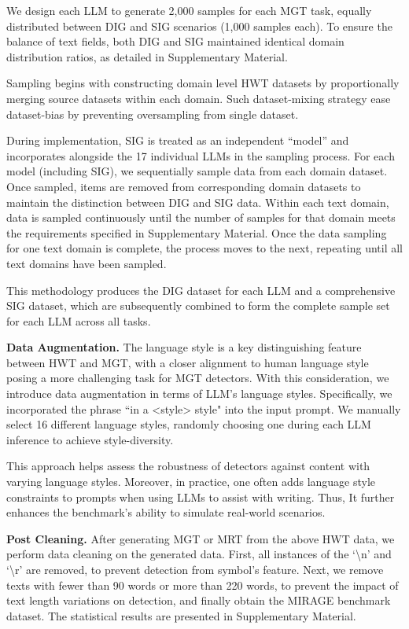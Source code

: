 %
We design each LLM to generate 2,000 samples for each MGT task, equally distributed between DIG and SIG scenarios (1,000 samples each).
%
To ensure the balance of text fields, both DIG and SIG maintained identical domain distribution ratios, as detailed in Supplementary Material.

Sampling begins with constructing domain level HWT datasets by proportionally merging source datasets within each domain.
%
Such dataset-mixing strategy ease dataset-bias by preventing oversampling from single dataset.

During implementation, SIG is treated as an independent ``model'' and incorporates alongside the 17 individual LLMs in the sampling process.
%
For each model (including SIG), we sequentially sample data from each domain dataset.
%
Once sampled, items are removed from corresponding domain datasets to maintain the distinction between DIG and SIG data.
%
Within each text domain, data is sampled continuously until the number of samples for that domain meets the requirements specified in Supplementary Material.
%
Once the data sampling for one text domain is complete, the process moves to the next, repeating until all text domains have been sampled.

This methodology produces the DIG dataset for each LLM and a comprehensive SIG dataset, which are subsequently combined to form the complete sample set for each LLM across all tasks.

\noindent \textbf{Data Augmentation. }
The language style is a key distinguishing feature between HWT and MGT, with a closer alignment to human language style posing a more challenging task for MGT detectors.
%
With this consideration, we introduce data augmentation in terms of LLM's language styles. 
%
Specifically, we incorporated the phrase ``in a <style> style" into the input prompt.
%
We manually select 16 different language styles, randomly choosing one during each LLM inference to achieve style-diversity.

This approach helps assess the robustness of detectors against content with varying language styles.
%
Moreover, in practice, one often adds language style constraints to prompts when using LLMs to assist with writing.
%
Thus, It further enhances the benchmark’s ability to simulate real-world scenarios.

\noindent \textbf{Post Cleaning. }
After generating MGT or MRT from the above HWT data, we perform data cleaning on the generated data.
%
First, all instances of the `\textbackslash n' and `\textbackslash r' are removed, to prevent detection from symbol's feature.
%
Next, we remove texts with fewer than 90 words or more than 220 words, to prevent the impact of text length variations on detection, and finally obtain the MIRAGE benchmark dataset.
%
The statistical results are presented in Supplementary Material.

